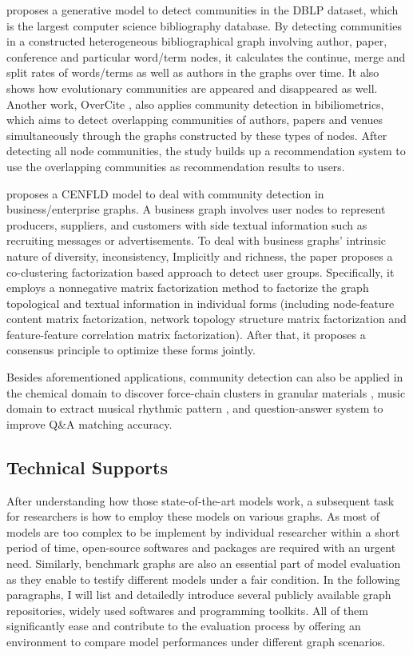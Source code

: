 \cite{gupta2011evolutionary} proposes a generative model to detect communities in the DBLP dataset, which is the largest computer science bibliography database. By detecting communities in a  constructed heterogeneous bibliographical graph involving author, paper, conference and particular word/term nodes, it calculates the continue, merge and split rates of words/terms as well as authors in the graphs over time. It also shows how evolutionary communities are appeared and disappeared as well. Another work, OverCite \cite{chakraborty2013overcite}, also applies community detection in bibiliometrics, which aims to detect overlapping communities of authors, papers and venues simultaneously through the graphs constructed by these types of nodes. After detecting all node communities, the study builds up a recommendation system to use the overlapping communities as recommendation results to users.

\cite{hu2016co} proposes a CENFLD model to deal with community detection in business/enterprise graphs. A business graph involves user nodes to represent  producers, suppliers, and customers with side textual information such as recruiting messages or advertisements. To deal with business graphs' intrinsic nature of diversity, inconsistency, Implicitly and richness, the paper proposes a co-clustering factorization based approach to detect user groups. Specifically, it employs a nonnegative matrix factorization method to factorize the graph topological and textual information in individual forms (including node-feature content matrix factorization, network topology structure matrix factorization and feature-feature correlation matrix factorization). After that, it proposes a consensus principle to optimize these forms jointly. 

Besides aforementioned applications, community detection can also be applied in the chemical domain to discover force-chain clusters in granular materials \cite{bassett2015extraction}, music domain to extract musical rhythmic pattern \cite{coca2016musical}, and question-answer system \cite{fang2016community} to improve Q\&A matching accuracy.  

\subsection{Technical Supports}

After understanding how those state-of-the-art models work, a subsequent task for researchers is how to employ these models on various graphs. As most of models are too complex to be implement by individual researcher within a short period of time, open-source softwares and packages are required with an urgent need. Similarly,  benchmark graphs are also an essential part of model evaluation as they enable to testify different models under a fair condition.  In the following paragraphs, I will list and detailedly introduce several publicly available graph repositories, widely used softwares and programming toolkits. All of them significantly ease and contribute to the evaluation process by offering an environment to compare model performances under different graph scenarios.

